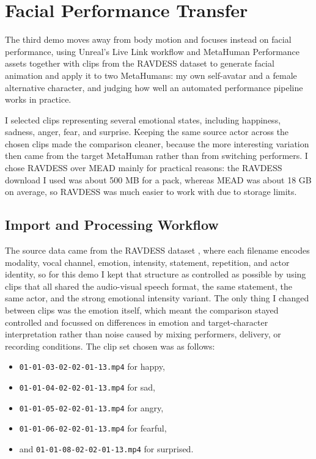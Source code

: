 \section{Facial Performance Transfer}

The third demo moves away from body motion and focuses instead on facial performance, using Unreal's Live Link workflow and MetaHuman Performance assets \cite{epic_live_link,epic_metahuman_performance} together with clips from the RAVDESS dataset \cite{livingstone_russo_ravdess_2018,ravdess_dataset} to generate facial animation and apply it to two MetaHumans: my own self-avatar and a female alternative character, and judging how well an automated performance pipeline works in practice.

I selected clips representing several emotional states, including happiness, sadness, anger, fear, and surprise. Keeping the same source actor across the chosen clips made the comparison cleaner, because the more interesting variation then came from the target MetaHuman rather than from switching performers. I chose RAVDESS over MEAD mainly for practical reasons: the RAVDESS download I used was about 500 MB for a pack, whereas MEAD was about 18 GB on average, so RAVDESS was much easier to work with due to storage limits.

\subsection{Import and Processing Workflow}

The source data came from the RAVDESS dataset \cite{livingstone_russo_ravdess_2018,ravdess_dataset}, where each filename encodes modality, vocal channel, emotion, intensity, statement, repetition, and actor identity, so for this demo I kept that structure as controlled as possible by using clips that all shared the audio-visual speech format, the same statement, the same actor, and the strong emotional intensity variant. The only thing I changed between clips was the emotion itself, which meant the comparison stayed controlled and focussed on differences in emotion and target-character interpretation rather than noise caused by mixing performers, delivery, or recording conditions. The clip set chosen was as follows:

\begin{itemize}[leftmargin=*]
    \item \texttt{01-01-03-02-02-01-13.mp4} for happy,
    \item \texttt{01-01-04-02-02-01-13.mp4} for sad,
    \item \texttt{01-01-05-02-02-01-13.mp4} for angry,
    \item \texttt{01-01-06-02-02-01-13.mp4} for fearful,
    \item and \texttt{01-01-08-02-02-01-13.mp4} for surprised.
\end{itemize}

